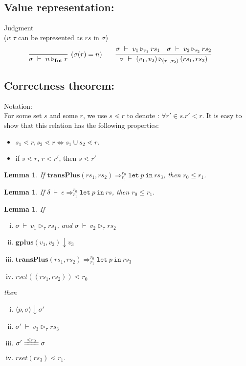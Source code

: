 \documentclass[a4paper]{article}
\newtheorem{lem}[equation]{Lemma}
\def\Int{\mathbf{Int}}
\def\Gplus#1#2{\mathbf{gplus} (#1,#2)}
\def\Eva{\downarrow}
\def\Ra{\Rightarrow}
\def\Env{\ \vdash\ }
\def\Sgm{\sigma}
\def\Jug#1{Judgment \boxed{#1} \\[1ex]}
\def\FEval#1#2{#1 \Eva #2}  %
\def\TaSem#1#2#3{\langle #1,#2 \rangle \Eva #3}
\def\Talet#1#2{\mathtt{let} \ #1 \ \mathtt{in} \ #2}
\def\Trans#1#2#3#4#5{#1 \Env #2 \Ra^{#4}_{#5} #3}
\def\TransP#1#2#3#4#5{\mathbf{transPlus} (#1,#2) \Ra^{#4}_{#5} #3}
\def\ValRep#1#2#3#4{#1 \Env #2 \triangleright_{#4} #3}
\def\ConEq#1{\xlongequal{<#1}}  %
\def\SetLe{\lessdot} %
\begin{document}
\subsection{Value representation:}
\Jug{\ValRep{\Sgm}{v}{rs}{\tau}}
($v: \tau$ can be represented as $rs$ in $\Sgm$)
$$
\infer[(\Sgm(r)=n)]{\ValRep{\Sgm}{n}{r}{\Int}}{}
\qquad
\infer{\ValRep{\Sgm}{(v_1,v_2)}{(rs_1,rs_2)}{(\tau_1,\tau_2)}}
{\ValRep{\Sgm}{v_1}{rs_1}{\tau_1} & {\ValRep{\Sgm}{v_2}{rs_2}{\tau_2}}}
\qquad
$$




\subsection{Correctness theorem:}
Notation:\\
For some set $s$ and some $r$, we use $s \SetLe r$ to denote : $\forall r' \in s. r' < r$. It is easy to show that this relation has the following properties:

\begin{itemize}
	\item $s_1 \SetLe r, s_2 \SetLe r \Leftrightarrow s_1 \cup s_2 \SetLe r$.
	\item if $s \SetLe r$, $r < r'$, then $s \SetLe r'$
\end{itemize}


\begin{lem}
	If $\TransP{rs_1}{rs_2}{\Talet{p}{rs_3}}{r_0}{r_1}$, then $r_0 \le r_1$.
\end{lem}

\begin{lem}
	If $\Trans{\delta}{e}{\Talet{p}{rs}}{r_0}{r_1}$, then $r_0 \le r_1$.
	\label{fresh2}
\end{lem}


\begin{lem}
   If \begin{enumerate}[(i)]
   	\item $\ValRep{\Sgm}{v_1}{rs_1}{\tau}$, and $\ValRep{\Sgm}{v_2}{rs_2}{\tau}$
   	\item $\FEval{\Gplus{v_1}{v_2}}{v_3}$
   	\item $\TransP{rs_1}{rs_2}{\Talet{p}{rs_3}} {r_0} {r_1}$
   	\item $rset((rs_1,rs_2)) \SetLe r_0$
   \end{enumerate}
   then 
   \begin{enumerate}[(i)]
   	\item $\TaSem{p}{\Sgm}{\Sgm'}$ 
   	\item $\ValRep{\Sgm'}{v_3}{rs_3}{\tau}$
   	\item $\Sgm' \ConEq{r_0} \Sgm$
   	\item $ rset(rs_3) \SetLe r_1  $.
   	
   	\label{trans-fresh} 
   \end{enumerate}
\label{plus-thm}   
\end{lem}
\end{document}
